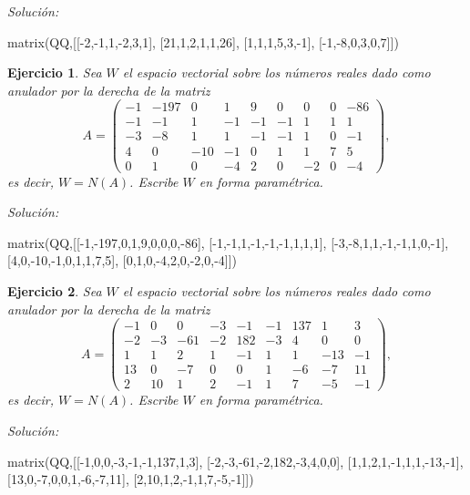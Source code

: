 \documentclass{amsart}
\newtheorem{ejer}{Ejercicio}
\begin{document}
{\it Soluci\'on:}

\begin{sageblock}
matrix(QQ,[[-2,-1,1,-2,3,1],
[21,1,2,1,1,26],
[1,1,1,5,3,-1],
[-1,-8,0,3,0,7]])
\end{sageblock}



\begin{ejer} Sea $W$ el espacio vectorial sobre los números reales dado
como anulador por la derecha de la matriz 
\[A = \left(\begin{array}{rrrrrrrrr}
-1 & -197 & 0 & 1 & 9 & 0 & 0 & 0 & -86 \\
-1 & -1 & 1 & -1 & -1 & -1 & 1 & 1 & 1 \\
-3 & -8 & 1 & 1 & -1 & -1 & 1 & 0 & -1 \\
4 & 0 & -10 & -1 & 0 & 1 & 1 & 7 & 5 \\
0 & 1 & 0 & -4 & 2 & 0 & -2 & 0 & -4
\end{array}\right),\]
es decir, $W = N(A)$. Escribe $W$ en forma param\'etrica.
\end{ejer}

{\it Soluci\'on:}

\begin{sageblock}
matrix(QQ,[[-1,-197,0,1,9,0,0,0,-86],
[-1,-1,1,-1,-1,-1,1,1,1],
[-3,-8,1,1,-1,-1,1,0,-1],
[4,0,-10,-1,0,1,1,7,5],
[0,1,0,-4,2,0,-2,0,-4]])
\end{sageblock}



\begin{ejer} Sea $W$ el espacio vectorial sobre los números reales dado
como anulador por la derecha de la matriz 
\[A = \left(\begin{array}{rrrrrrrrr}
-1 & 0 & 0 & -3 & -1 & -1 & 137 & 1 & 3 \\
-2 & -3 & -61 & -2 & 182 & -3 & 4 & 0 & 0 \\
1 & 1 & 2 & 1 & -1 & 1 & 1 & -13 & -1 \\
13 & 0 & -7 & 0 & 0 & 1 & -6 & -7 & 11 \\
2 & 10 & 1 & 2 & -1 & 1 & 7 & -5 & -1
\end{array}\right),\]
es decir, $W = N(A)$. Escribe $W$ en forma param\'etrica.
\end{ejer}

{\it Soluci\'on:}

\begin{sageblock}
matrix(QQ,[[-1,0,0,-3,-1,-1,137,1,3],
[-2,-3,-61,-2,182,-3,4,0,0],
[1,1,2,1,-1,1,1,-13,-1],
[13,0,-7,0,0,1,-6,-7,11],
[2,10,1,2,-1,1,7,-5,-1]])
\end{sageblock}
\end{document}
